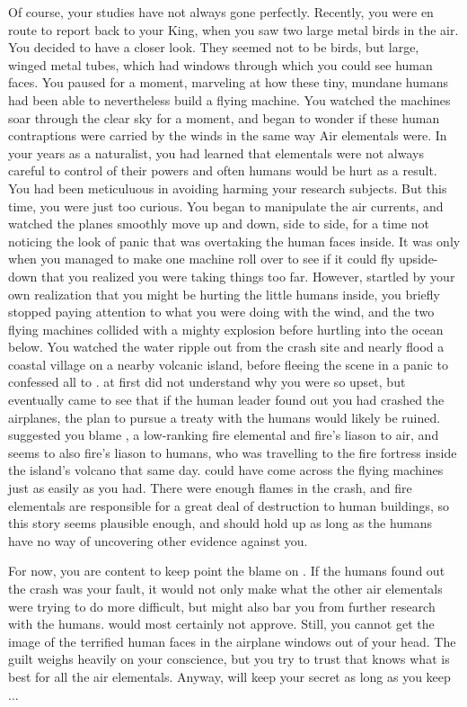 \documentclass[char]{elementals}
\begin{document}
Of course, your studies have not always gone perfectly.  Recently, you were en route to report back to your King, when you saw two large metal birds in the air.  You decided to have a closer look.  They seemed not to be birds, but large, winged metal tubes, which had windows through which you could see human faces.  You paused for a moment, marveling at how these tiny, mundane humans had been able to nevertheless build a flying machine.  You watched the machines soar through the clear sky for a moment, and began to wonder if these human contraptions were carried by the winds in the same way Air elementals were. In your years as a naturalist, you had learned that elementals were not always careful to control of their powers and often humans would be hurt as a result.  You had been meticuluous in avoiding harming your research subjects.  But this time, you were just too curious. You began to manipulate the air currents, and watched the planes smoothly move up and down, side to side, for a time not noticing the look of panic that was overtaking the human faces inside.  It was only when you managed to make one machine roll over to see if it could fly upside-down that you realized you were taking things too far.  However, startled by your own realization that you might be hurting the little humans inside, you briefly stopped paying attention to what you were doing with the wind, and the two flying machines collided with a mighty explosion before hurtling into the ocean below.  You watched the water ripple out from the crash site and nearly flood a coastal village on a nearby volcanic island, before fleeing the scene in a panic to confessed all to \cKing{}.  \cKing{\They} at first did not understand why you were so upset, but eventually \cKing{\they} came to see that if the human leader found out you had crashed the airplanes, the  plan to pursue a treaty with the humans would likely be ruined.  \cKing{} suggested you blame \cJuliet{\intro}, a low-ranking fire elemental and fire's liason to air, and seems to also fire's liason to humans, who was travelling to the fire fortress inside the island's volcano that same day. \cJuliet{\they} could have come across the flying machines just as easily as you had.  There were enough flames in the crash, and fire elementals are responsible for a great deal of destruction to human buildings, so this story seems plausible enough, and should hold up as long as the humans have no way of uncovering other evidence against you.  

For now, you are content to keep point the blame on \cJuliet{}.  If the humans found out the crash was your fault, it would not only make what the other air elementals were trying to do more difficult, but might also bar you from further research with the humans.  \cDiplomat{} would most certainly not approve.  Still, you cannot get the image of the terrified human faces in the airplane windows out of your head.  The guilt weighs heavily on your conscience, but you try to trust that \cKing{} knows what is best for all the air elementals. Anyway, \cKing{\they} will keep your secret as long as you keep ...
\end{document}
